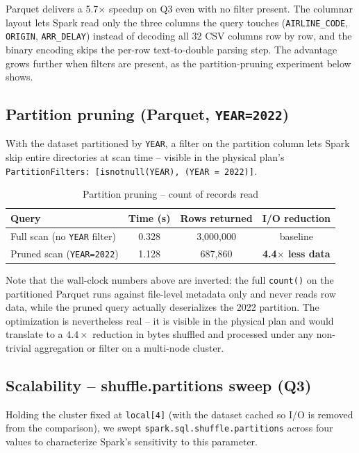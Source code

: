 \documentclass{article}
\begin{document}
Parquet delivers a 5.7$\times$ speedup on Q3 even with no filter present. The columnar layout lets Spark read only the three columns the query touches (\texttt{AIRLINE\_CODE}, \texttt{ORIGIN}, \texttt{ARR\_DELAY}) instead of decoding all 32 CSV columns row by row, and the binary encoding skips the per-row text-to-double parsing step. The advantage grows further when filters are present, as the partition-pruning experiment below shows.

\subsection{Partition pruning (Parquet, \texttt{YEAR=2022})}
With the dataset partitioned by \texttt{YEAR}, a filter on the partition column lets Spark skip entire directories at scan time -- visible in the physical plan's \texttt{PartitionFilters: [isnotnull(YEAR), (YEAR = 2022)]}.

\begin{table}[H]
\centering
\caption{Partition pruning -- count of records read}
\begin{tabular}{@{}lccc@{}}
\toprule
\textbf{Query} & \textbf{Time (s)} & \textbf{Rows returned} & \textbf{I/O reduction} \\
\midrule
Full scan (no \texttt{YEAR} filter) & 0.328 & 3{,}000{,}000 & baseline \\
Pruned scan (\texttt{YEAR=2022})    & 1.128 & 687{,}860     & \textbf{4.4$\times$ less data} \\
\bottomrule
\end{tabular}
\end{table}

Note that the wall-clock numbers above are inverted: the full \texttt{count()} on the partitioned Parquet runs against file-level metadata only and never reads row data, while the pruned query actually deserializes the 2022 partition. The optimization is nevertheless real -- it is visible in the physical plan and would translate to a $4.4\times$ reduction in bytes shuffled and processed under any non-trivial aggregation or filter on a multi-node cluster.

\subsection{Scalability -- shuffle.partitions sweep (Q3)}
Holding the cluster fixed at \texttt{local[4]} (with the dataset cached so I/O is removed from the comparison), we swept \texttt{spark.sql.shuffle.partitions} across four values to characterize Spark's sensitivity to this parameter.
\end{document}
